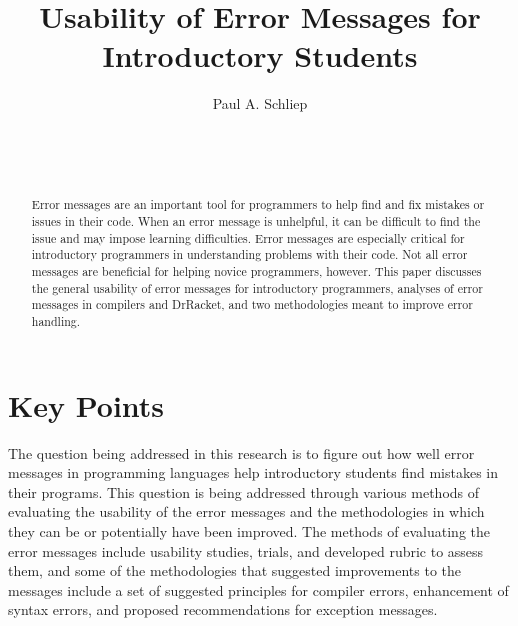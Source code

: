 \documentclass{sig-alternate}
\begin{document}

\title{Usability of Error Messages for Introductory Students}


\author{
\alignauthor
Paul A. Schliep\\
	\\
	\\
	\\
}

\maketitle

\begin{abstract}
Error messages are an important tool for programmers to help find and fix mistakes or issues in their code.
When an error message is unhelpful, it can be difficult to find the issue and may impose learning difficulties.
Error messages are especially critical for introductory programmers in understanding problems with their code.
Not all error messages are beneficial for helping novice programmers, however.
This paper discusses the general usability of error messages for introductory programmers, analyses of error messages in compilers and DrRacket, and two methodologies meant to improve error handling.
\end{abstract}


\section{Key Points}

The question being addressed in this research is to figure out how well error messages in programming languages help introductory students find mistakes in their programs. This question is being addressed through various methods of evaluating the usability of the error messages and the methodologies in which they can be or potentially have been improved. The methods of evaluating the error messages include usability studies, trials, and developed rubric to assess them, and some of the methodologies that suggested improvements to the messages include a set of suggested principles for compiler errors, enhancement of syntax errors, and proposed recommendations for exception messages.
\end{document}

